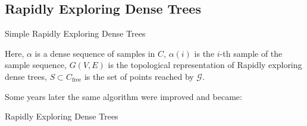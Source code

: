 \subsection{Rapidly Exploring Dense Trees}
\begin{algorithm}[H]
    \caption{Simple Rapidly Exploring Dense Trees}
        \begin{algorithmic}[1]
            \EndFor 
        \end{algorithmic}
\end{algorithm}
Here, $\alpha$ is a dense sequence of samples in $C$, $\alpha(i)$ is the $i$-th sample of the sample sequence, $G(V, E)$ is the topological representation of Rapidly exploring dense trees, $S \subset C_{\text{free}}$ is the set of points reached by $\mathcal{G}$. 

Some years later the same algorithm were improved and became: 
\begin{algorithm}[H]
    \caption{Rapidly Exploring Dense Trees}
        \begin{algorithmic}[1]
                \EndIf
            \EndFor
        \end{algorithmic}
\end{algorithm}

